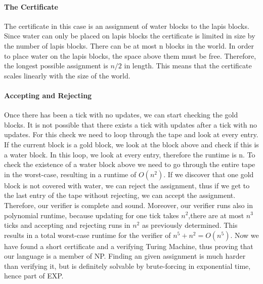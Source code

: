 	\paragraph{The Certificate}
	The certificate in this case is an assignment of water blocks to the lapis blocks.
	Since water can only be placed on lapis blocks the certificate is limited in size by the number of lapis blocks.
	There can be at most n blocks in the world. In order to place water on the lapis blocks, the space above them must be free.
	Therefore, the longest possible assignment is $n/2$ in length. This means that the certificate scales linearly with the size of the world.
	
	
 	\paragraph{Accepting and Rejecting}
	Once there has been a tick with no updates, we can start checking the gold blocks. It is not possible that there exists a tick with updates after a tick with no updates. For this check we need to loop through the tape and look at every entry. If the current block is a gold block, we look at the block above and check if this is a water block. In this loop, we look at every entry, therefore the runtime is n. To check the existence of a water block above we need to go through the entire tape in the worst-case, resulting in a runtime of $O(n^{2})$. If we discover that one gold block is not covered with water, we can reject the assignment, thus if we get to the last entry of the tape without rejecting, we can accept the assignment. Therefore, our verifier is complete and sound. Moreover, our verifier runs also in polynomial runtime, because updating for one tick takes $n^{2}$,there are at most $n^{3}$ ticks and accepting and rejecting runs in $n^{2}$ as previously determined. This results in a total worst-case runtime for the verifier of $n^5 + n^2 = O(n^5)$.
	\newline\newline Now we have found a short certificate and a verifying Turing Machine, thus proving that our language is a member of NP. Finding an given assignment is much harder than verifying it, but is definitely solvable by brute-forcing in exponential time, hence part of EXP.
